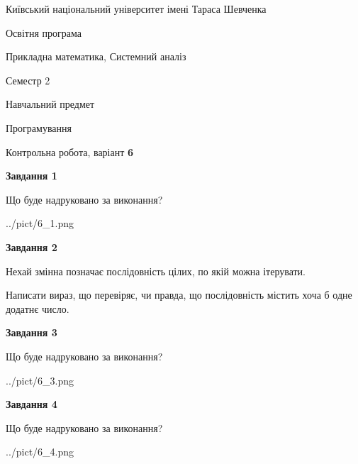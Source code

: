 \documentclass[12pt, ukrainian]{article}
\begin{document}
{{\begin {small}\par
{ \center  Київський національний університет імені Тараса Шевченка \par}
{\parbox {5 cm}{Освітня програма \hfill}{\parbox {8 cm}{Прикладна математика, Системний аналіз \hfill}}\parbox {5 cm}{\hfill Семестр 2}}\par
{\parbox {5 cm} {Навчальний предмет \hfill}\parbox {7 cm}{Програмування \hfill}\parbox {6cm}{\hfill}\par}\vspace{-7pt} \end{small}}{\center Контрольна робота, варіант  \No \textbf
{ 6 }\par}}
{
\begin {large}
{\begin {center}\textbf{Завдання 1}\end {center}}\par
Що буде надруковано за виконання?\par\par
\begin{center}
	{../pict/6_1.png}
\end{center}
\newpage

{\begin {center}\textbf{Завдання 2}\end {center}}\par
Нехай змінна  позначає послідовність цілих, по якій можна ітерувати.

Написати вираз, що перевіряє, чи правда, що послідовність  містить хоча б одне додатнє число.\par
\newpage

{\begin {center}\textbf{Завдання 3}\end {center}}\par
Що буде надруковано за виконання?\par
\begin{center}
	{../pict/6_3.png}
\end{center}
\newpage

{\begin {center}\textbf{Завдання 4}\end {center}}\par
Що буде надруковано за виконання?\par
\begin{center}
	{../pict/6_4.png}
\end{center}
\newpage


\end{large}}
\end{document}
